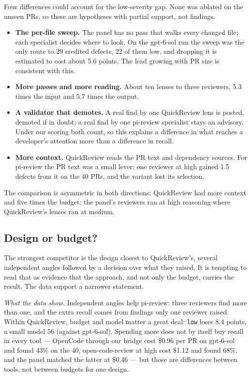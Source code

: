 \documentclass[11pt,a4paper]{article}
\newcommand{\qcr}{QuickReview}
\newcommand{\code}[1]{\texttt{#1}}
\begin{document}
Four differences could account for the low-severity gap. None was ablated
on the unseen PRs, so these are hypotheses with partial support, not
findings.
\begin{itemize}
  \item \textbf{The per-file sweep.} The panel has no pass that walks every
  changed file; each specialist decides where to look. On the gpt-6-sol run
  the sweep was the only route to 29 credited defects, 22 of them low, and
  dropping it is estimated to cost about 5.6 points. The lead growing with PR
  size is consistent with this.
  \item \textbf{More passes and more reading.} About ten lenses to three
  reviewers, 5.3 times the input and 5.7 times the output.
  \item \textbf{A validator that demotes.} A real find by one \qcr{} lens is
  posted, demoted if in doubt; a real find by one pi-review specialist stays
  an advisory. Under our scoring both count, so this explains a difference
  in what reaches a developer's attention more than a difference in recall.
  \item \textbf{More context.} \qcr{} reads the PR text and dependency
  sources. For pi-review the PR text was a small lever: one reviewer at high
  gained 1.5 defects from it on the 40 PRs, and the variant lost its
  selection.
\end{itemize}

\noindent The comparison is asymmetric in both directions: \qcr{} had more
context and five times the budget; the panel's reviewers ran at high
reasoning where \qcr{}'s lenses ran at medium.

\subsection{Design or budget?}
\label{sec:designbudget}

The strongest competitor is the design closest to \qcr{}'s, several
independent angles followed by a decision over what they raised. It is
tempting to read that as evidence that the approach, and not only the
budget, carries the result. The data support a narrower statement.

\emph{What the data show.} Independent angles help pi-review: three
reviewers find more than one, and the extra recall comes from findings only
one reviewer raised. Within \qcr{}, budget and model matter a great deal:
\code{low} loses 8.4 points, a small model 56 (against gpt-6-sol). Spending more does not by
itself buy recall in every tool --- OpenCode through our bridge cost \$0.96
per PR on gpt-6-sol and found 43\% on the 40, open-code-review at high cost
\$1.12 and found 68\%, and the panel matched the latter at \$0.46 --- but
those are differences between tools, not between budgets for one design.
\end{document}
